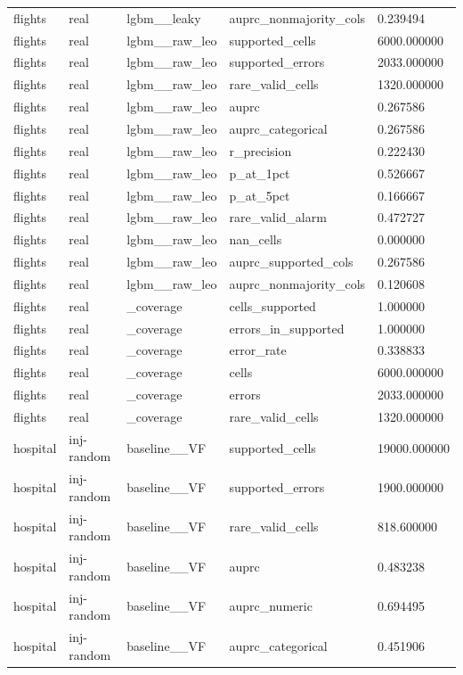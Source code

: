 \begin{tabular}{lllll}
flights & real & lgbm\_\_leaky & auprc\_nonmajority\_cols & 0.239494 \\
flights & real & lgbm\_\_raw\_leo & supported\_cells & 6000.000000 \\
flights & real & lgbm\_\_raw\_leo & supported\_errors & 2033.000000 \\
flights & real & lgbm\_\_raw\_leo & rare\_valid\_cells & 1320.000000 \\
flights & real & lgbm\_\_raw\_leo & auprc & 0.267586 \\
flights & real & lgbm\_\_raw\_leo & auprc\_categorical & 0.267586 \\
flights & real & lgbm\_\_raw\_leo & r\_precision & 0.222430 \\
flights & real & lgbm\_\_raw\_leo & p\_at\_1pct & 0.526667 \\
flights & real & lgbm\_\_raw\_leo & p\_at\_5pct & 0.166667 \\
flights & real & lgbm\_\_raw\_leo & rare\_valid\_alarm & 0.472727 \\
flights & real & lgbm\_\_raw\_leo & nan\_cells & 0.000000 \\
flights & real & lgbm\_\_raw\_leo & auprc\_supported\_cols & 0.267586 \\
flights & real & lgbm\_\_raw\_leo & auprc\_nonmajority\_cols & 0.120608 \\
flights & real & \_coverage & cells\_supported & 1.000000 \\
flights & real & \_coverage & errors\_in\_supported & 1.000000 \\
flights & real & \_coverage & error\_rate & 0.338833 \\
flights & real & \_coverage & cells & 6000.000000 \\
flights & real & \_coverage & errors & 2033.000000 \\
flights & real & \_coverage & rare\_valid\_cells & 1320.000000 \\
hospital & inj-random & baseline\_\_VF & supported\_cells & 19000.000000 \\
hospital & inj-random & baseline\_\_VF & supported\_errors & 1900.000000 \\
hospital & inj-random & baseline\_\_VF & rare\_valid\_cells & 818.600000 \\
hospital & inj-random & baseline\_\_VF & auprc & 0.483238 \\
hospital & inj-random & baseline\_\_VF & auprc\_numeric & 0.694495 \\
hospital & inj-random & baseline\_\_VF & auprc\_categorical & 0.451906 \\

\end{tabular}
